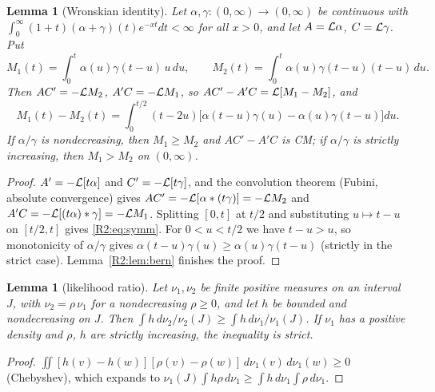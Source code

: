 \documentclass[11pt]{amsart}
\newtheorem{lemma}[theorem]{Lemma}
\theoremstyle{definition}
\theoremstyle{remark}
\begin{document}
\begin{lemma}[Wronskian identity]\label{R2:lem:wronski}
Let $\alpha,\gamma\colon(0,\infty)\to(0,\infty)$ be continuous with
$\int_0^\infty(1+t)(\alpha+\gamma)(t)e^{-xt}dt<\infty$ for all $x>0$, and
let $A=\mathcal{L}\alpha$, $C=\mathcal{L}\gamma$. Put
\[
 M_1(t)=\int_0^t\alpha(u)\gamma(t-u)\,u\,du,\qquad
 M_2(t)=\int_0^t\alpha(u)\gamma(t-u)(t-u)\,du .
\]
Then $AC'=-\mathcal{L} M_2$, $A'C=-\mathcal{L} M_1$, so $AC'-A'C=\mathcal{L}[M_1-M_2]$, and
\begin{equation}\label{R2:eq:symm}
 M_1(t)-M_2(t)=\int_0^{t/2}(t-2u)\bigl[\alpha(t-u)\gamma(u)-\alpha(u)\gamma(t-u)\bigr]du .
\end{equation}
If $\alpha/\gamma$ is nondecreasing, then $M_1\ge M_2$ and $AC'-A'C$ is CM;
if $\alpha/\gamma$ is strictly increasing, then $M_1>M_2$ on $(0,\infty)$.
\end{lemma}
\begin{proof}
$A'=-\mathcal{L}[t\alpha]$ and $C'=-\mathcal{L}[t\gamma]$, and the convolution theorem
(Fubini, absolute convergence) gives $AC'=-\mathcal{L}[\alpha*(t\gamma)]=-\mathcal{L} M_2$
and $A'C=-\mathcal{L}[(t\alpha)*\gamma]=-\mathcal{L} M_1$. Splitting $[0,t]$ at $t/2$ and
substituting $u\mapsto t-u$ on $[t/2,t]$ gives \eqref{R2:eq:symm}. For
$0<u<t/2$ we have $t-u>u$, so monotonicity of $\alpha/\gamma$ gives
$\alpha(t-u)\gamma(u)\ge\alpha(u)\gamma(t-u)$ (strictly in the strict case).
Lemma~\ref{R2:lem:bern} finishes the proof.
\end{proof}

\begin{lemma}[likelihood ratio]\label{R2:lem:lr}
Let $\nu_1,\nu_2$ be finite positive measures on an interval $J$, with
$\nu_2=\rho\,\nu_1$ for a nondecreasing $\rho\ge0$, and let $h$ be bounded
and nondecreasing on $J$. Then
$\int h\,d\nu_2/\nu_2(J)\ge\int h\,d\nu_1/\nu_1(J)$. If $\nu_1$ has a
positive density and $\rho$, $h$ are strictly increasing, the inequality is
strict.
\end{lemma}
\begin{proof}
$\iint[h(v)-h(w)][\rho(v)-\rho(w)]\,d\nu_1(v)\,d\nu_1(w)\ge0$
(Chebyshev), which expands to
$\nu_1(J)\int h\rho\,d\nu_1\ge\int h\,d\nu_1\int\rho\,d\nu_1$.
\end{proof}
\end{document}
